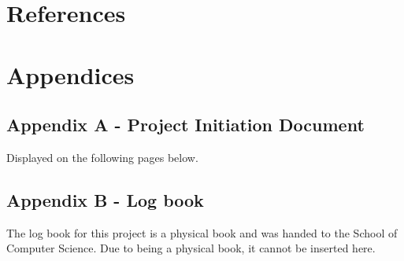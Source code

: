 \documentclass[oneside, 10pt]{article}
\begin{document}
	\newpage
	
	\section{References}
	\nocite{*}
	\printbibliography
	
	\newpage
	\section{Appendices}
		\subsection{Appendix A - Project Initiation Document}
		Displayed on the following pages below.
		
		\subsection{Appendix B - Log book}
		The log book for this project is a physical book and was handed to the School of Computer Science. Due to being a physical book, it cannot be inserted here.
	
\end{document}
